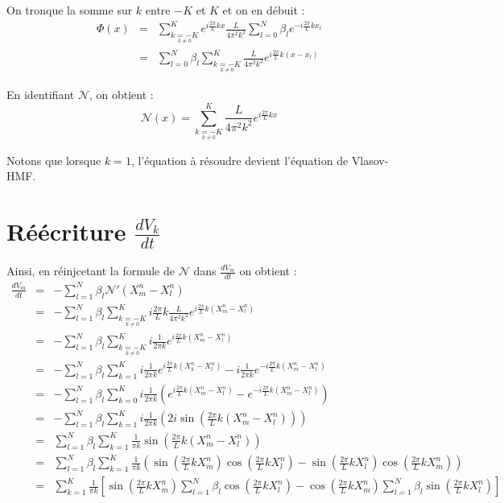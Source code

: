 \documentclass[a4paper,11pt]{article}
\begin{document}
On tronque la somme sur $k$ entre $-K$ et $K$ et on en débuit :
$$
\begin{array}{rcl}
\Phi(x) &=& \sum\limits_{\underset{k \neq 0}{k=-K}}^K e^{i\frac{2 \pi}{L} kx} \frac{L}{4 \pi^2 k^2} \sum\limits_{l=0} ^N \beta_l e^{-i\frac{2 \pi}{L} kx_l} \\
 &=& \sum\limits_{l=0} ^N \beta_l \sum\limits_{\underset{k \neq 0}{k=-K}}^K \frac{L}{4 \pi^2 k^2}  e^{i\frac{2 \pi}{L} k( x -x_l)}
\end{array}
$$

En identifiant $\mathcal{N}$, on obtient :
$$
\mathcal{N}(x) = \sum\limits_{\underset{k \neq 0}{k=-K}}^K \frac{L}{4 \pi^2 k^2}  e^{i\frac{2 \pi}{L} kx}
$$

Notons que lorsque $k=1$, l'équation à résoudre devient l'équation de Vlasov-HMF.

\section{Réécriture $\frac{dV_k}{dt}$}

Ainsi, en réinjcetant la formule de $\mathcal{N}$ dans $\frac{dV_m}{dt}$ on obtient :
$$
\begin{array}{rcl}
\frac{d V_m} {dt} &=& -\sum\limits_{l=1}^N \beta_l  \mathcal{N}'(X_m^n-X_l^n) \\
 &=& -\sum\limits_{l=1}^N \beta_l  \sum\limits_{\underset{k \neq 0}{k=-K}}^K i\frac{2 \pi}{L} k \frac{L}{4 \pi^2 k^2}  e^{i\frac{2 \pi}{L} k(X_m^n-X_l^n)} \\
 &=& -\sum\limits_{l=1}^N \beta_l  \sum\limits_{\underset{k \neq 0}{k=-K}}^K i \frac{1}{2 \pi k}  e^{i\frac{2 \pi}{L} k(X_m^n-X_l^n)} \\
 &=& -\sum\limits_{l=1}^N \beta_l  \sum\limits_{k=1}^K i \frac{1}{2 \pi k}  e^{i\frac{2 \pi}{L} k(X_k^n-X_l^n)} - i \frac{1}{2 \pi k}  e^{-i\frac{2 \pi}{L} k(X_m^n-X_l^n)} \\
 &=& -\sum\limits_{l=1}^N \beta_l  \sum\limits_{k=0}^K i \frac{1}{2 \pi k}(e^{i\frac{2 \pi}{L} k(X_m^n-X_l^n)} - e^{-i\frac{2 \pi}{L} k(X_m^n-X_l^n)}) \\
 &=& -\sum\limits_{l=1}^N \beta_l  \sum\limits_{k=1}^K i \frac{1}{2 \pi k}(2i \sin (\frac{2 
\pi}{L} k(X_m^n-X_l^n))) \\
 &=& \sum\limits_{l=1}^N \beta_l  \sum\limits_{k=1}^K \frac{1}{ \pi k}\sin (\frac{2 \pi}{L} k(X_m^n-X_l^n)) \\
 &=& \sum\limits_{l=1}^N \beta_l  \sum\limits_{k=1}^K \frac{1}{ \pi k}(\sin (\frac{2 \pi}{L} kX_m^n)\cos (\frac{2 \pi}{L} kX_l^n)- \sin(\frac{2 \pi}{L}kX_l^n)\cos(\frac{2 \pi}{L} kX_m^n)) \\
 &=& \sum\limits_{k=1}^K \frac{1}{ \pi k} [\sin (\frac{2 \pi}{L} kX_m^n)\sum\limits_{l=1}^N \beta_l  \cos (\frac{2 \pi}{L} kX_l^n)- \cos(\frac{2 \pi}{L} kX_m^n)\sum\limits_{l=1}^N \beta_l \sin(\frac{2 \pi}{L}kX_l^n)] \\
\end{array}
$$
\end{document}
